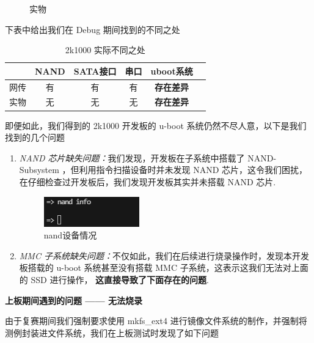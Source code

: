 \begin{figure}[htbp]
\begin{minipage}{0.49\linewidth}
		\caption{实物}
		\label{Board-RealEstate}
	\end{minipage}
\end{figure}

下表中给出我们在 Debug 期间找到的不同之处

\begin{table}[htbp]
	\begin{center}
		\begin{tabular}{|c|c|c|c|c|c|}
			\hline
			& NAND & SATA接口 & 串口 & uboot系统\\
			\hline
			\hline
			网传 & 有 & 有 & 有 & \textbf{存在差异} \\
			\hline
			实物 & 无 & 无 & 无 & \textbf{存在差异} \\
			\hline
		\end{tabular}
		\caption{2k1000 实际不同之处}
	\end{center}
\end{table}

即便如此，我们得到的 2k1000 开发板的 u-boot 系统仍然不尽人意，以下是我们找到的几个问题

\begin{enumerate}
	\item \textit{NAND 芯片缺失问题：}我们发现，开发板在子系统中搭载了 NAND-Subsystem ，但利用指令扫描设备时并未发现 NAND 芯片，这令我们困扰，在仔细检查过开发板后，我们发现开发板其实并未搭载 NAND 芯片.
		  \begin{figure}[htbp]
			\centering
			\includegraphics[width=0.5\linewidth]{figs/nand设备情况.png}
			\caption{nand设备情况}
			\label{nand设备情况}
		  \end{figure}
	\item \textit{MMC 子系统缺失问题：}不仅如此，我们在后续进行烧录操作时，发现本开发板搭载的 u-boot 系统甚至没有搭载 MMC 子系统，这表示这我们无法对上面的 SSD 进行操作， \textbf{这直接导致了下面存在的问题}.
\end{enumerate}

\begin{center}
	\textbf{上板期间遇到的问题 —— 无法烧录}
\end{center}

由于复赛期间我们强制要求使用 mkfs_ext4 进行镜像文件系统的制作，并强制将测例封装进文件系统，我们在上板测试时发现了如下问题

